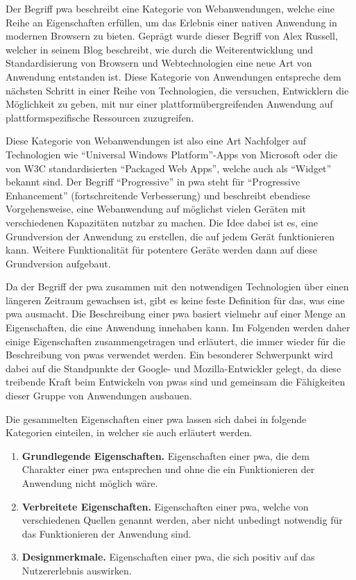 \documentclass[12pt, parskip=half]{scrartcl}       %
\newcommand\litem[1]{\item{\bfseries#1.\space}}
\begin{document}
Der Begriff \acl{pwa} beschreibt eine Kategorie von Webanwendungen, welche eine Reihe an Eigenschaften erfüllen, um das Erlebnis einer nativen Anwendung in modernen Browsern zu bieten.
Geprägt wurde dieser Begriff von Alex Russell, welcher in seinem Blog\cite{russell_pwaescapingtabs} beschreibt, wie durch die Weiterentwicklung und Standardisierung von Browsern und Webtechnologien eine neue Art von Anwendung entstanden ist.
Diese Kategorie von Anwendungen entspreche dem nächsten Schritt in einer Reihe von Technologien, die versuchen, Entwicklern die Möglichkeit zu geben, mit nur einer plattformübergreifenden Anwendung auf plattformspezifische Ressourcen zuzugreifen.

Diese Kategorie von Webanwendungen ist also eine Art Nachfolger auf Technologien wie \enquote{Universal Windows Platform}-Apps\cite{msdocs_uwp} von Microsoft oder die von W3C standardisierten \enquote{Packaged Web Apps}\cite{w3c_packagedwebapps}, welche auch als \enquote{Widget} bekannt sind.
Der Begriff \enquote{Progressive} in \acl{pwa} steht für \enquote{Progressive Enhancement} (fortschreitende Verbesserung) und beschreibt ebendiese Vorgehensweise, eine Webanwendung auf möglichst vielen Geräten mit verschiedenen Kapazitäten nutzbar zu machen.
Die Idee dabei ist es, eine Grundversion der Anwendung zu erstellen, die auf jedem Gerät funktionieren kann.
Weitere Funktionalität für potentere Geräte werden dann auf diese Grundversion aufgebaut.

Da der Begriff der \ac{pwa} zusammen mit den notwendigen Technologien über einen längeren Zeitraum gewachsen ist, gibt es keine feste Definition für das, was eine \ac{pwa} ausmacht.
Die Beschreibung einer \ac{pwa} basiert vielmehr auf einer Menge an Eigenschaften, die eine Anwendung innehaben kann.
Im Folgenden werden daher einige Eigenschaften zusammengetragen und erläutert, die immer wieder für die Beschreibung von \acp{pwa} verwendet werden.
Ein besonderer Schwerpunkt wird dabei auf die Standpunkte der Google- und Mozilla-Entwickler gelegt, da diese treibende Kraft beim Entwickeln von \acp{pwa} sind und gemeinsam die Fähigkeiten dieser Gruppe von Anwendungen ausbauen.

\newpage %

Die gesammelten Eigenschaften einer \ac{pwa} lassen sich dabei in folgende Kategorien einteilen, in welcher sie auch erläutert werden.

\begin{enumerate}
  \litem{Grundlegende Eigenschaften} Eigenschaften einer \ac{pwa}, die dem Charakter einer \ac{pwa} entsprechen und ohne die ein Funktionieren der Anwendung nicht möglich wäre.

  \litem{Verbreitete Eigenschaften} Eigenschaften einer \ac{pwa}, welche von verschiedenen Quellen genannt werden, aber nicht unbedingt notwendig für das Funktionieren der Anwendung sind.

  \litem{Designmerkmale} Eigenschaften einer \ac{pwa}, die sich positiv auf das Nutzererlebnis auswirken.
\end{enumerate}
\end{document}
